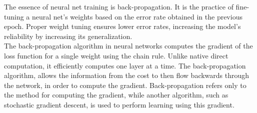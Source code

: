 The essence of neural net training is back-propagation. It is the practice of fine-tuning a neural net's weights based on the error rate obtained in the previous epoch. Proper weight tuning ensures lower error rates, increasing the model's reliability by increasing its generalization. \\

The back-propagation algorithm in neural networks computes the gradient of the loss function for a single weight using the chain rule. Unlike native direct computation, it efficiently computes one layer at a time. The back-propagation algorithm, allows the information from the cost to then flow backwards through the network, in order to compute the gradient. Back-propagation refers only to the method for computing the gradient, while another algorithm,
such as stochastic gradient descent, is used to perform learning using this gradient.

